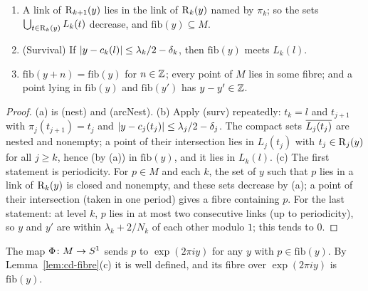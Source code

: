 
\begin{lemma}[Fibres]\label{lem:cd-fibre}
\begin{enumerate}[label=(\alph*)]
\item A link of $\operatorname{R}_{k+1}(y)$ lies in the link of $\operatorname{R}_k(y)$ named by $\pi_k$; so the sets $\bigcup_{t\in\operatorname{R}_k(y)}L_k(t)$ decrease, and $\mathrm{fib}(y)\subseteq M$.
\item (Survival) If $\left\lvert y-c_k(l)\right\rvert\le\lambda_k/2-\delta_k$, then $\mathrm{fib}(y)$ meets $L_k(l)$.
\item $\mathrm{fib}(y+n)=\mathrm{fib}(y)$ for $n\in\mathbb{Z}$; every point of $M$ lies in some fibre; and a point lying in $\mathrm{fib}(y)$ and $\mathrm{fib}(y')$ has $y-y'\in\mathbb{Z}$.
\end{enumerate}
\end{lemma}

\begin{proof}
(a) is (nest) and (arcNest). (b) Apply (surv) repeatedly: $t_k=l$ and $t_{j+1}$ with $\pi_j(t_{j+1})=t_j$ and $\left\lvert y-c_j(t_j)\right\rvert\le\lambda_j/2-\delta_j$. The compact sets
$\overline{L_j(t_j)}$ are nested and nonempty; a point of their intersection lies in $L_j(t_j)$ with $t_j\in\operatorname{R}_j(y)$ for all $j\ge k$, hence (by (a)) in $\mathrm{fib}(y)$, and it lies in
$L_k(l)$. (c) The first statement is periodicity. For $p\in M$ and each $k$, the set of $y$ such that $p$ lies in a link of $\operatorname{R}_k(y)$ is closed and nonempty, and these sets
decrease by (a); a point of their intersection (taken in one period) gives a fibre containing $p$. For the last statement: at level $k$, $p$ lies in at most two consecutive links
(up to periodicity), so $y$ and $y'$ are within $\lambda_k+2/N_k$ of each other modulo $1$; this tends to $0$.
\end{proof}


\begin{definition}\label{def:cd-fmap}
The map $\Phi\colon M\to S^1$ sends $p$ to $\exp(2\pi iy)$ for any $y$ with $p\in\mathrm{fib}(y)$. By Lemma~\ref{lem:cd-fibre}(c) it is well defined, and its fibre over $\exp(2\pi
iy)$ is $\mathrm{fib}(y)$.
\end{definition}

